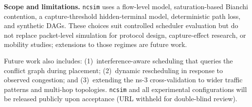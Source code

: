 \documentclass[conference]{IEEEtran}
\newcommand{\ncsim}{\texttt{ncsim}}
\begin{document}
\textbf{Scope and limitations.}  \ncsim{} uses a flow-level model,
saturation-based Bianchi contention, a capture-threshold hidden-terminal
model, deterministic path loss, and synthetic DAGs.  These choices suit
controlled scheduler evaluation but do not replace packet-level
simulation for protocol design, capture-effect research, or mobility
studies; extensions to those regimes are future work.

Future work also includes: (1)~interference-aware scheduling that
queries the conflict graph during placement; (2)~dynamic rescheduling
in response to observed congestion; and (3)~extending the ns-3
cross-validation to wider traffic patterns and multi-hop topologies.
\ncsim{} and all experimental configurations will be released publicly
upon acceptance (URL withheld for double-blind review).
\end{document}
